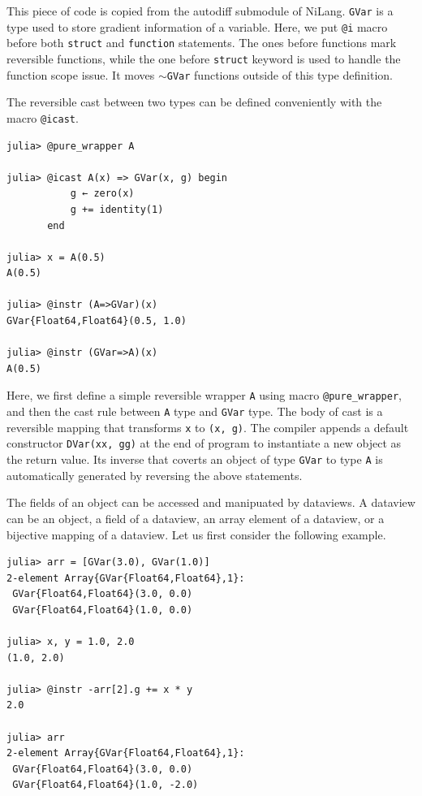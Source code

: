 \documentclass[aps,twocolumn,longbibliography,english,superscriptaddress]{revtex4-1}
\newcommand{\<}{\langle}
\renewcommand{\>}{\rangle}
\theoremstyle{definition}\newtheorem{definition}{\textit{Definition}}
\begin{document}
This piece of code is copied from the autodiff submodule of NiLang. \texttt{GVar} is a type used to store gradient information of a variable.
Here, we put \texttt{@i} macro before both \texttt{struct} and \texttt{function} statements. The ones before functions mark reversible functions, while the one before \texttt{struct} keyword is used to handle the function scope issue. It moves \texttt{$\sim$GVar} functions outside of this type definition.

The reversible cast between two types can be defined conveniently with the macro \texttt{@icast}.

\begin{minipage}{.44\textwidth}
\begin{lstlisting}
julia> @pure_wrapper A

julia> @icast A(x) => GVar(x, g) begin
           g ← zero(x)
           g += identity(1)
       end

julia> x = A(0.5)
A(0.5)

julia> @instr (A=>GVar)(x)
GVar{Float64,Float64}(0.5, 1.0)

julia> @instr (GVar=>A)(x)
A(0.5)
\end{lstlisting}
\end{minipage}

Here, we first define a simple reversible wrapper \texttt{A} using macro \texttt{@pure\_wrapper}, and then the cast rule between \texttt{A} type and \texttt{GVar} type.
The body of cast is a reversible mapping that transforms \texttt{x} to \texttt{(x, g)}. The compiler appends a default constructor \texttt{DVar(xx, gg)} at the end of program to instantiate a new object as the return value.
Its inverse that coverts an object of type \texttt{GVar} to type \texttt{A} is automatically generated by reversing the above statements.

The fields of an object can be accessed and manipuated by dataviews. A dataview can be an object, a field of a dataview, an array element of a dataview, or a bijective mapping of a dataview.
Let us first consider the following example.

\begin{minipage}{.44\textwidth}
\begin{lstlisting}
julia> arr = [GVar(3.0), GVar(1.0)]
2-element Array{GVar{Float64,Float64},1}:
 GVar{Float64,Float64}(3.0, 0.0)
 GVar{Float64,Float64}(1.0, 0.0)

julia> x, y = 1.0, 2.0
(1.0, 2.0)

julia> @instr -arr[2].g += x * y
2.0

julia> arr
2-element Array{GVar{Float64,Float64},1}:
 GVar{Float64,Float64}(3.0, 0.0) 
 GVar{Float64,Float64}(1.0, -2.0)
\end{lstlisting}
\end{minipage}
\end{document}
